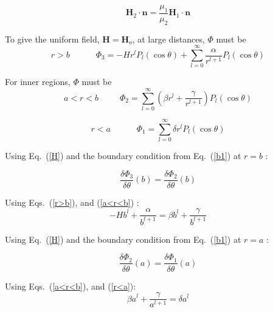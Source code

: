 \begin{equation}\label{b2}   
\bm{H}_2\cdot \bm{n}=\frac{\mu_{1}}{\mu_{2}}\bm{H}_1\cdot \bm{n}
\end{equation}


To give the uniform field, $\bm{H}=\bm{H}_o$, at large distances, $\Phi$ must be
\begin{equation}\label{r>b}
r>b\;\;\;\;\;\;\;\;\;\;\;\Phi_3=-Hr^lP_l(\cos\theta)+\sum_{l=0}^{\infty}\frac{\alpha}{r^{l+1}}P_l(\cos\theta)
\end{equation}

For inner regions, $\Phi$ must be
\begin{equation}\label{a<r<b}
a<r<b\;\;\;\;\;\;\;\;\;\Phi_2=\sum_{l=0}^{\infty} \left(\beta r^l+\frac{\gamma}{r^{l+1}}\right)P_l(\cos\theta)
\end{equation}

\begin{equation}\label{r<a}
r<a\;\;\;\;\;\;\;\;\;\;\;\Phi_1=\sum_{l=0}^{\infty} \delta r^l P_l(\cos\theta)
\end{equation}

Using Eq.~(\ref{H}) and the boundary condition from Eq.~(\ref{b1}) at $r=b$ :

$$\frac{\delta \Phi_3}{\delta \theta}(b)=\frac{\delta \Phi_2}{\delta \theta}(b)$$

Using Eqs.~(\ref{r>b}), and (\ref{a<r<b}) :
\begin{equation}\label{e01}
-Hb^l+\frac{\alpha}{b^{l+1}}=\beta b^l+\frac{\gamma}{b^{l+1}}
\end{equation}

Using Eq.~(\ref{H}) and the boundary condition from Eq.~(\ref{b1}) at $r=a$ :

$$\frac{\delta \Phi_2}{\delta \theta}(a)=\frac{\delta \Phi_1}{\delta \theta}(a)$$

Using Eqs.~(\ref{a<r<b}), and (\ref{r<a}):
\begin{equation}\label{e02}
\beta a^l+\frac{\gamma}{a^{l+1}}=\delta a^l
\end{equation}

